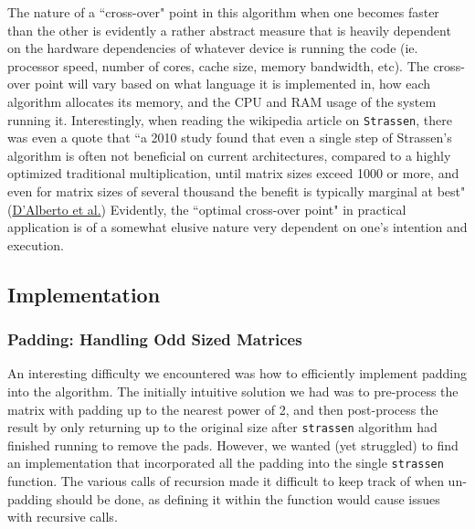 \documentclass[11pt]{scrartcl}
\theoremstyle{dotlessP}
\theoremstyle{dotlessN}
\theoremstyle{dotN}
\begin{document}
The nature of a ``cross-over" point in this algorithm when one becomes faster than the other is evidently a rather abstract measure that is heavily dependent on the hardware dependencies of whatever device is running the code (ie. processor speed, number of cores, cache size, memory bandwidth, etc). The cross-over point will vary based on what language it is implemented in, how each algorithm allocates its memory, and the CPU and RAM usage of the system running it. Interestingly, when reading the wikipedia article on \texttt{Strassen}, there was even a quote that ``a 2010 study found that even a single step of Strassen's algorithm is often not beneficial on current architectures, compared to a highly optimized traditional multiplication, until matrix sizes exceed 1000 or more, and even for matrix sizes of several thousand the benefit is typically marginal at best" (\href{https://ics.uci.edu/~paolo/Reference/paoloA.ishp-vi.pdf}{D'Alberto et al.}) Evidently, the ``optimal cross-over point" in practical application is of a somewhat elusive nature very dependent on one's intention and execution. 

\subsection{Implementation}
\subsubsection{Padding: Handling Odd Sized Matrices}
An interesting difficulty we encountered was how to efficiently implement padding into the algorithm. The initially intuitive solution we had was to pre-process the matrix with padding up to the nearest power of 2, and then post-process the result by only returning up to the original size after \texttt{strassen} algorithm had finished running to remove the pads. However, we wanted (yet struggled) to find an implementation that incorporated all the padding into the single \texttt{strassen} function. The various calls of recursion made it difficult to keep track of when un-padding should be done, as defining it within the function would cause issues with recursive calls. \\
\end{document}
